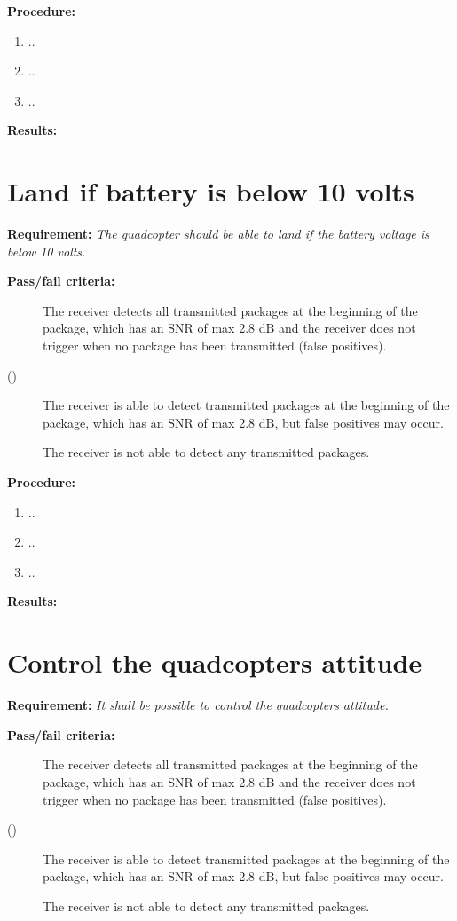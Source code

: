 		
\textbf{Procedure:}\\


\begin{enumerate}
	\item ..
	\item ..
	\item ..
\end{enumerate} 


\textbf{Results:}


\newpage

\section{Land if battery is below 10 volts}
\textbf{Requirement:}
\textit{The quadcopter should be able to land if the battery voltage is below 10 volts.}

\textbf{Pass/fail criteria:}
	\begin{description}
	\item[  ] The receiver detects all transmitted packages at the beginning of the package, which has an SNR of max 2.8 dB and the receiver does not trigger when no package has been transmitted (false positives).
	\item[()]The receiver is able to detect transmitted packages at the beginning of the package, which has an SNR of max 2.8 dB, but false positives may occur.
	\item[  \phantom{)}]The receiver is not able to detect any transmitted packages.
	\end{description}

		
\textbf{Procedure:}\\


\begin{enumerate}
	\item ..
	\item ..
	\item ..
\end{enumerate} 


\textbf{Results:}


\newpage

\section{Control the quadcopters attitude}
\textbf{Requirement:}
\textit{It shall be possible to control the quadcopters attitude.}

\textbf{Pass/fail criteria:}
	\begin{description}
	\item[  ] The receiver detects all transmitted packages at the beginning of the package, which has an SNR of max 2.8 dB and the receiver does not trigger when no package has been transmitted (false positives).
	\item[()]The receiver is able to detect transmitted packages at the beginning of the package, which has an SNR of max 2.8 dB, but false positives may occur.
	\item[  \phantom{)}]The receiver is not able to detect any transmitted packages.
	\end{description}
		
